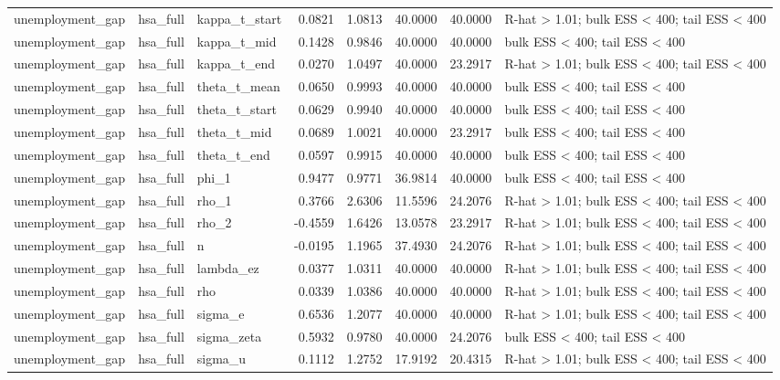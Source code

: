 \begin{tabular}{lllrrrrl}
unemployment\_gap & hsa\_full & kappa\_t\_start & 0.0821 & 1.0813 & 40.0000 & 40.0000 & R-hat > 1.01; bulk ESS < 400; tail ESS < 400 \\
unemployment\_gap & hsa\_full & kappa\_t\_mid & 0.1428 & 0.9846 & 40.0000 & 40.0000 & bulk ESS < 400; tail ESS < 400 \\
unemployment\_gap & hsa\_full & kappa\_t\_end & 0.0270 & 1.0497 & 40.0000 & 23.2917 & R-hat > 1.01; bulk ESS < 400; tail ESS < 400 \\
unemployment\_gap & hsa\_full & theta\_t\_mean & 0.0650 & 0.9993 & 40.0000 & 40.0000 & bulk ESS < 400; tail ESS < 400 \\
unemployment\_gap & hsa\_full & theta\_t\_start & 0.0629 & 0.9940 & 40.0000 & 40.0000 & bulk ESS < 400; tail ESS < 400 \\
unemployment\_gap & hsa\_full & theta\_t\_mid & 0.0689 & 1.0021 & 40.0000 & 23.2917 & bulk ESS < 400; tail ESS < 400 \\
unemployment\_gap & hsa\_full & theta\_t\_end & 0.0597 & 0.9915 & 40.0000 & 40.0000 & bulk ESS < 400; tail ESS < 400 \\
unemployment\_gap & hsa\_full & phi\_1 & 0.9477 & 0.9771 & 36.9814 & 40.0000 & bulk ESS < 400; tail ESS < 400 \\
unemployment\_gap & hsa\_full & rho\_1 & 0.3766 & 2.6306 & 11.5596 & 24.2076 & R-hat > 1.01; bulk ESS < 400; tail ESS < 400 \\
unemployment\_gap & hsa\_full & rho\_2 & -0.4559 & 1.6426 & 13.0578 & 23.2917 & R-hat > 1.01; bulk ESS < 400; tail ESS < 400 \\
unemployment\_gap & hsa\_full & n & -0.0195 & 1.1965 & 37.4930 & 24.2076 & R-hat > 1.01; bulk ESS < 400; tail ESS < 400 \\
unemployment\_gap & hsa\_full & lambda\_ez & 0.0377 & 1.0311 & 40.0000 & 40.0000 & R-hat > 1.01; bulk ESS < 400; tail ESS < 400 \\
unemployment\_gap & hsa\_full & rho & 0.0339 & 1.0386 & 40.0000 & 40.0000 & R-hat > 1.01; bulk ESS < 400; tail ESS < 400 \\
unemployment\_gap & hsa\_full & sigma\_e & 0.6536 & 1.2077 & 40.0000 & 40.0000 & R-hat > 1.01; bulk ESS < 400; tail ESS < 400 \\
unemployment\_gap & hsa\_full & sigma\_zeta & 0.5932 & 0.9780 & 40.0000 & 24.2076 & bulk ESS < 400; tail ESS < 400 \\
unemployment\_gap & hsa\_full & sigma\_u & 0.1112 & 1.2752 & 17.9192 & 20.4315 & R-hat > 1.01; bulk ESS < 400; tail ESS < 400 \\

\end{tabular}
